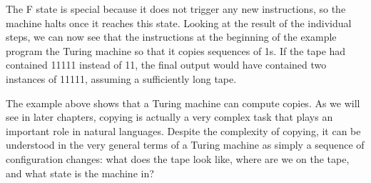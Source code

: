 \begin{examplebox}
\begin{center}

    \end{center}
    
    The F state is special because it does not trigger any new instructions, so the machine halts once it reaches this state.
    Looking at the result of the individual steps, we can now see that the instructions at the beginning of the example program the Turing machine so that it copies sequences of 1s.
    If the tape had contained 11111 instead of 11, the final output would have contained two instances of 11111, assuming a sufficiently long tape.
\end{examplebox}

The example above shows that a Turing machine can compute copies.
As we will see in later chapters, copying is actually a very complex task that plays an important role in natural languages.
Despite the complexity of copying, it can be understood in the very general terms of a Turing machine as simply a sequence of configuration changes: what does the tape look like, where are we on the tape, and what state is the machine in?

